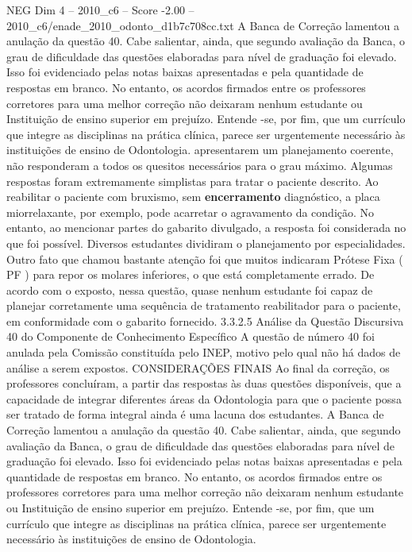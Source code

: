 \begin{textsample}{NEG Dim 4 – 2010\_c6 – Score -2.00 – 2010\_c6/enade\_2010\_odonto\_d1b7c708cc.txt}
A Banca de Correção lamentou a anulação da questão 40.
Cabe salientar, ainda, que segundo avaliação da Banca, o grau de dificuldade das questões elaboradas para nível de graduação foi elevado.
Isso foi evidenciado pelas notas baixas apresentadas e pela quantidade de respostas em branco.
No entanto, os acordos firmados entre os professores corretores para uma melhor correção não deixaram nenhum estudante ou Instituição de ensino superior em prejuízo.
Entende -se, por fim, que um currículo que integre as disciplinas na prática clínica, parece ser urgentemente necessário às instituições de ensino de Odontologia. apresentarem um planejamento coerente, não responderam a todos os quesitos necessários para o grau máximo.
Algumas respostas foram extremamente simplistas para tratar o paciente descrito.
Ao reabilitar o paciente com bruxismo, sem \textbf{encerramento} diagnóstico, a placa miorrelaxante, por exemplo, pode acarretar o agravamento da condição.
No entanto, ao mencionar partes do gabarito divulgado, a resposta foi considerada no que foi possível.
Diversos estudantes dividiram o planejamento por especialidades.
Outro fato que chamou bastante atenção foi que muitos indicaram Prótese Fixa ( PF ) para repor os molares inferiores, o que está completamente errado.
De acordo com o exposto, nessa questão, quase nenhum estudante foi capaz de planejar corretamente uma sequência de tratamento reabilitador para o paciente, em conformidade com o gabarito fornecido. 3.3.2.5 Análise da Questão Discursiva 40 do Componente de Conhecimento Específico A questão de número 40 foi anulada pela Comissão constituída pelo INEP, motivo pelo qual não há dados de análise a serem expostos.
CONSIDERAÇÕES FINAIS Ao final da correção, os professores concluíram, a partir das respostas às duas questões disponíveis, que a capacidade de integrar diferentes áreas da Odontologia para que o paciente possa ser tratado de forma integral ainda é uma lacuna dos estudantes.
A Banca de Correção lamentou a anulação da questão 40.
Cabe salientar, ainda, que segundo avaliação da Banca, o grau de dificuldade das questões elaboradas para nível de graduação foi elevado.
Isso foi evidenciado pelas notas baixas apresentadas e pela quantidade de respostas em branco.
No entanto, os acordos firmados entre os professores corretores para uma melhor correção não deixaram nenhum estudante ou Instituição de ensino superior em prejuízo.
Entende -se, por fim, que um currículo que integre as disciplinas na prática clínica, parece ser urgentemente necessário às instituições de ensino de Odontologia.

\end{textsample}
